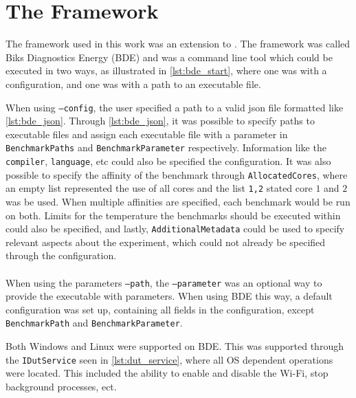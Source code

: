 \section{The Framework}\label{app:framework}

The framework used in this work was an extension to \cite{biksbois}. The framework was called Biks Diagnostics Energy (BDE) and was a command line tool which could be executed in two ways, as illustrated in \cref{lst:bde_start}, where one was with a configuration, and one was with a path to an executable file.



When using \texttt{--config}, the user specified a path to a valid json file formatted like \cref{lst:bde_json}. Through \cref{lst:bde_json}, it was possible to specify paths to executable files and assign each executable file with a parameter in \texttt{BenchmarkPaths} and \texttt{BenchmarkParameter} respectively. Information like the \texttt{compiler}, \texttt{language}, etc could also be specified the configuration. It was also possible to specify the affinity of the benchmark through \texttt{AllocatedCores}, where an empty list represented the use of all cores and the list \texttt{1,2} stated core $1$ and $2$ was be used. When multiple affinities are specified, each benchmark would be run on both. Limits for the temperature the benchmarks should be executed within could also be specified, and lastly, \texttt{AdditionalMetadata} could be used to specify relevant aspects about the experiment, which could not already be specified through the configuration.



\paragraph*{}
When using the parameters \texttt{--path}, the \texttt{--parameter} was an optional way to provide the executable with parameters. When using BDE this way, a default configuration was set up, containing all fields in the configuration, except \texttt{BenchmarkPath} and \texttt{BenchmarkParameter}.
\newpage



Both Windows and Linux were supported on BDE. This was supported through the \texttt{IDutService} seen in \cref{lst:dut_service}, where all OS dependent operations were located. This included the ability to enable and disable the Wi-Fi, stop background processes, ect.

